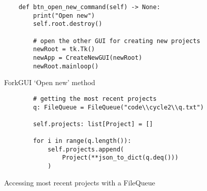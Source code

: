 \newpage
\begin{listing}[!ht]
    \begin{verbatim}
    def btn_open_new_command(self) -> None:
        print("Open new")
        self.root.destroy()
        
        # open the other GUI for creating new projects
        newRoot = tk.Tk()
        newApp = CreateNewGUI(newRoot)
        newRoot.mainloop()
    \end{verbatim}
    \caption{ForkGUI `Open new' method}
    \label{sc:forkgui-opennew-method-final}
\end{listing}

\newpage
\begin{listing}[!ht]
    \begin{verbatim}
        # getting the most recent projects
        q: FileQueue = FileQueue("code\\cycle2\\q.txt")

        self.projects: list[Project] = []
        
        for i in range(q.length()):
            self.projects.append(
                Project(**json_to_dict(q.deq()))
            )
    \end{verbatim}
    \caption{Accessing most recent projects with a FileQueue}
    \label{sc:fileq-with-gui}
\end{listing}

